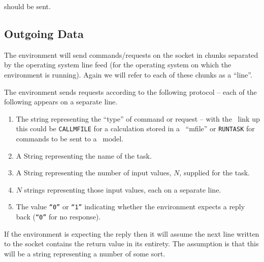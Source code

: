 should be sent.

\subsection{Outgoing Data}

The environment will send commands/requests on the socket in chunks separated by the operating system line feed (for the operating system on which the environment is running).  Again we will refer to each of these chunks as a ``line''.

The environment sends requests according to the following protocol -- each of the following appears on a separate line.

\begin{enumerate}
\item  The string representing the ``type'' of command or request -- with the \matlab\ link up this could be \texttt{CALLMFILE} for a calculation stored in a \matlab\ ``mfile'' or \texttt{RUNTASK} for commands to be sent to a \simulink\ model.
\item  A String representing the name of the task.
\item  A String representing the number of input values, $N$, supplied for the task.
\item  $N$ strings representing those input values, each on a separate line.
\item  The value \texttt{``0''} or \texttt{``1''} indicating whether the environment expects a reply back (\texttt{``0''} for no response).
\end{enumerate}

If the environment is expecting the reply then it will assume the next line written to the socket contains the return value in its entirety.  The assumption is that this will be a string representing a number of some sort.



